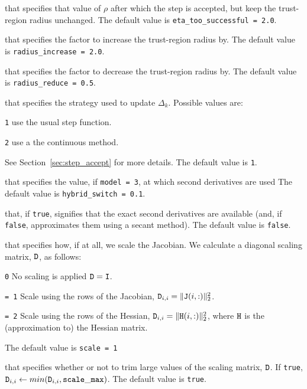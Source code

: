 \begin{description}
that specifies that value of $\rho$ after which the step is accepted, but keep the trust-region radius unchanged.
The default value is {\tt eta\_too\_successful = 2.0}.

that specifies the factor to increase the trust-region radius by.
The default value is {\tt radius\_increase = 2.0}.

that specifies the factor to decrease the trust-region radius by.
The default value is {\tt radius\_reduce = 0.5}.

that specifies the strategy used to update $\Delta_k$.  Possible values are:
\begin{description}
\item {\tt 1} use the usual step function.
\item {\tt 2} use a the continuous method.
\end{description}
See Section~\ref{sec:step_accept} for more details.
The default value is {\tt 1}.

that specifies the value, if {\tt model = 3}, at which second derivatives are used
The default value is {\tt hybrid\_switch = 0.1}.

that, if {\tt true}, signifies that the exact second derivatives are available (and, if {\tt false}, approximates them using a secant method).
The default value is {\tt false}.

that specifies how, if at all, we scale the Jacobian.  We calculate a diagonal scaling matrix, ${\tt D}$, as follows:
\begin{description}
\item{\tt 0} No scaling is applied ${\tt D} ={\tt I}$.
\item{\tt = 1} Scale using the rows of the Jacobian, \({\tt D}_{i,i} = \|{\tt J}(i,:)\|_2^2\).
\item{\tt = 2} Scale using the rows of the Hessian,  \({\tt D}_{i,i} = \|{\tt H}(i,:)\|_2^2\), where ${\tt H}$ is the (approximation to) the Hessian matrix.
\end{description}
The default value is {\tt scale = 1}

that specifies whether or not to trim large values of the scaling matrix, ${\tt D}$.
If {\tt true}, ${\tt D}_{i,i} \leftarrow min({\tt D}_{i,i}, {\tt scale\_max})$.
The default value is {\tt true}.


\end{description}
